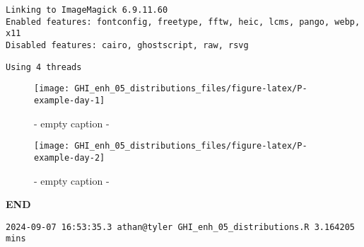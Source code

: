 \documentclass[
  10pt,
  a4paper,oneside]{article}
\begin{document}
\begin{verbatim}
Linking to ImageMagick 6.9.11.60
Enabled features: fontconfig, freetype, fftw, heic, lcms, pango, webp, x11
Disabled features: cairo, ghostscript, raw, rsvg
\end{verbatim}

\begin{verbatim}
Using 4 threads
\end{verbatim}

\begin{figure}[H]

{\centering \texttt{[image: GHI\_enh\_05\_distributions\_files/figure-latex/P-example-day-1]} 

}

\caption{ - empty caption - }\label{fig:P-example-day-1}
\end{figure}
\begin{figure}[H]

{\centering \texttt{[image: GHI\_enh\_05\_distributions\_files/figure-latex/P-example-day-2]} 

}

\caption{ - empty caption - }\label{fig:P-example-day-2}
\end{figure}

\textbf{END}

\begin{verbatim}
2024-09-07 16:53:35.3 athan@tyler GHI_enh_05_distributions.R 3.164205 mins
\end{verbatim}
\end{document}
